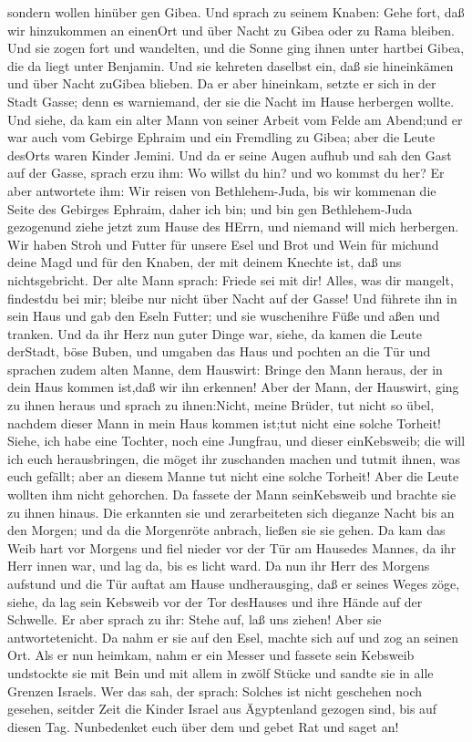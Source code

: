 sondern wollen hinüber gen Gibea.  Und sprach zu seinem
Knaben: Gehe fort, daß wir hinzukommen an einenOrt und über Nacht zu
Gibea oder zu Rama bleiben.  Und sie zogen fort und
wandelten, und die Sonne ging ihnen unter hartbei Gibea, die da liegt
unter Benjamin.  Und sie kehreten daselbst ein, daß sie
hineinkämen und über Nacht zuGibea blieben. Da er aber hineinkam, setzte
er sich in der Stadt Gasse; denn es warniemand, der sie die Nacht im
Hause herbergen wollte.  Und siehe, da kam ein alter Mann
von seiner Arbeit vom Felde am Abend;und er war auch vom Gebirge Ephraim
und ein Fremdling zu Gibea; aber die Leute desOrts waren Kinder Jemini.
 Und da er seine Augen aufhub und sah den Gast auf der
Gasse, sprach erzu ihm: Wo willst du hin? und wo kommst du her?
 Er aber antwortete ihm: Wir reisen von Bethlehem-Juda, bis
wir kommenan die Seite des Gebirges Ephraim, daher ich bin; und bin gen
Bethlehem-Juda gezogenund ziehe jetzt zum Hause des HErrn, und niemand
will mich herbergen.  Wir haben Stroh und Futter für unsere
Esel und Brot und Wein für michund deine Magd und für den Knaben, der
mit deinem Knechte ist, daß uns nichtsgebricht.  Der alte
Mann sprach: Friede sei mit dir! Alles, was dir mangelt, findestdu bei
mir; bleibe nur nicht über Nacht auf der Gasse!  Und
führete ihn in sein Haus und gab den Eseln Futter; und sie wuschenihre
Füße und aßen und tranken.  Und da ihr Herz nun guter Dinge
war, siehe, da kamen die Leute derStadt, böse Buben, und umgaben das
Haus und pochten an die Tür und sprachen zudem alten Manne, dem
Hauswirt: Bringe den Mann heraus, der in dein Haus kommen ist,daß wir
ihn erkennen!  Aber der Mann, der Hauswirt, ging zu ihnen
heraus und sprach zu ihnen:Nicht, meine Brüder, tut nicht so übel,
nachdem dieser Mann in mein Haus kommen ist;tut nicht eine solche
Torheit!  Siehe, ich habe eine Tochter, noch eine Jungfrau,
und dieser einKebsweib; die will ich euch herausbringen, die möget ihr
zuschanden machen und tutmit ihnen, was euch gefällt; aber an diesem
Manne tut nicht eine solche Torheit!  Aber die Leute
wollten ihm nicht gehorchen. Da fassete der Mann seinKebsweib und
brachte sie zu ihnen hinaus. Die erkannten sie und zerarbeiteten sich
dieganze Nacht bis an den Morgen; und da die Morgenröte anbrach, ließen
sie sie gehen.  Da kam das Weib hart vor Morgens und fiel
nieder vor der Tür am Hausedes Mannes, da ihr Herr innen war, und lag
da, bis es licht ward.  Da nun ihr Herr des Morgens
aufstund und die Tür auftat am Hause undherausging, daß er seines Weges
zöge, siehe, da lag sein Kebsweib vor der Tor desHauses und ihre Hände
auf der Schwelle.  Er aber sprach zu ihr: Stehe auf, laß
uns ziehen! Aber sie antwortetenicht. Da nahm er sie auf den Esel,
machte sich auf und zog an seinen Ort.  Als er nun heimkam,
nahm er ein Messer und fassete sein Kebsweib undstockte sie mit Bein und
mit allem in zwölf Stücke und sandte sie in alle Grenzen Israels.
 Wer das sah, der sprach: Solches ist nicht geschehen noch
gesehen, seitder Zeit die Kinder Israel aus Ägyptenland gezogen sind,
bis auf diesen Tag. Nunbedenket euch über dem und gebet Rat und saget
an!


